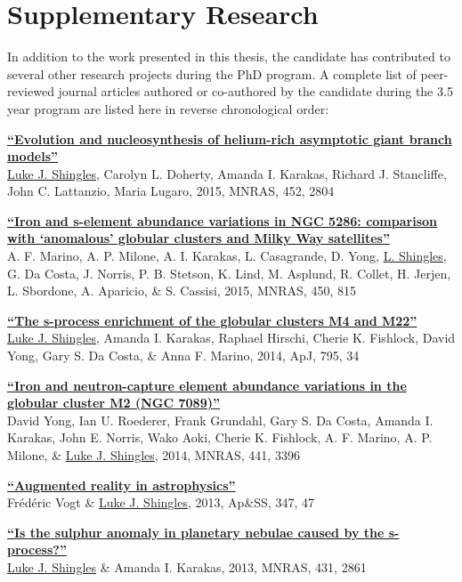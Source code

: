 \section*{Supplementary Research}
In addition to the work presented in this thesis, the candidate has contributed to several other research projects during the PhD program. A complete list of peer-reviewed journal articles authored or co-authored by the candidate during the 3.5 year program are listed here in reverse chronological order:

\newcommand{\highlightauthor}[1]{\underline{#1}}
\newcommand{\articletitle}[1]{{\flushleft\textbf{#1}}}

\articletitle{\href{http://adsabs.harvard.edu/abs/2015MNRAS.452.2804S}{``Evolution and nucleosynthesis of helium-rich asymptotic giant branch models''}}\\
\highlightauthor{Luke J. Shingles}, Carolyn L. Doherty, Amanda I. Karakas, Richard J. Stancliffe, John C. Lattanzio, Maria Lugaro, 2015, MNRAS, 452, 2804

\articletitle{\href{http://adsabs.harvard.edu/abs/2015MNRAS.450..815M}{``Iron and s-element abundance variations in NGC 5286: comparison with `anomalous' globular clusters and Milky Way satellites''}}\\
A. F. Marino, A. P. Milone, A. I. Karakas, L. Casagrande, D. Yong, \highlightauthor{L. Shingles}, G. Da Costa, J. Norris, P. B. Stetson,  K. Lind, M. Asplund, R. Collet, H. Jerjen, L. Sbordone, A. Aparicio, \& S. Cassisi, 2015, MNRAS, 450, 815

\articletitle{\href{http://adsabs.harvard.edu/abs/2014ApJ...795...34S}{``The s-process enrichment of the globular clusters M4 and M22''}}\\
\highlightauthor{Luke J. Shingles}, Amanda I. Karakas, Raphael Hirschi, Cherie K. Fishlock, David Yong, Gary S. Da Costa, \& Anna F. Marino, 2014, ApJ, 795, 34

\articletitle{\href{http://adsabs.harvard.edu/abs/2014MNRAS.441.3396Y}{``Iron and neutron-capture element abundance variations in the globular cluster M2 (NGC 7089)''}}\\
David Yong, Ian U. Roederer, Frank Grundahl, Gary S. Da Costa, Amanda I. Karakas, John E. Norris, Wako Aoki, Cherie K. Fishlock, A. F. Marino, A. P. Milone, \& \highlightauthor{Luke J. Shingles}, 2014, MNRAS, 441, 3396

\articletitle{\href{http://adsabs.harvard.edu/abs/2013Ap\%26SS.347...47V}{``Augmented reality in astrophysics''}}\\
Fr\'{e}d\'{e}ric Vogt \& \highlightauthor{Luke J. Shingles}, 2013, Ap\&SS, 347, 47

\articletitle{\href{http://adsabs.harvard.edu/abs/2013MNRAS.431.2861S}{``Is the sulphur anomaly in planetary nebulae caused by the s-process?''}}\\
\highlightauthor{Luke J. Shingles} \& Amanda I. Karakas, 2013, MNRAS, 431, 2861
